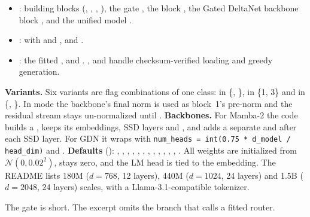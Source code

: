 \begin{implnote}[title={In the code: map of \texttt{repos/HaoranZhengRaul\_\_AMOR}}]
\begin{itemize}
  \item {}: building blocks (,
        , , ), the gate
        , the block , the Gated DeltaNet backbone block
        , and the unified model .
  \item {}:  with
         and , and .
  \item {}: the fitted ,
         and . , 
        and  handle checksum-verified loading and greedy generation.
\end{itemize}
\textbf{Variants.} Six variants are flag combinations of one class:  in
\{, \},  in \{1, 3\} and  in
\{, \}. In  mode the backbone's final norm is used as block~1's
pre-norm and the residual stream stays un-normalized until .
\textbf{Backbones.} For Mamba-2 the code builds a  ,
keeps its embeddings, SSD layers and , and adds a separate  and
 after each SSD layer. For GDN it wraps  with
\texttt{num\_heads = int(0.75 * d\_model / head\_dim)} and .
\textbf{Defaults} (): , ,
, , , , ,
, , ,
, , . All weights
are initialized from $\mathcal{N}(0,0.02^2)$,  stays zero, and the LM head is tied to
the embedding. The README lists 180M ($d=768$, 12 layers), 440M ($d=1024$, 24 layers) and 1.5B
($d=2048$, 24 layers) scales, with a Llama-3.1-compatible tokenizer.
\end{implnote}

The gate is short. The excerpt omits the branch that calls a fitted router.

